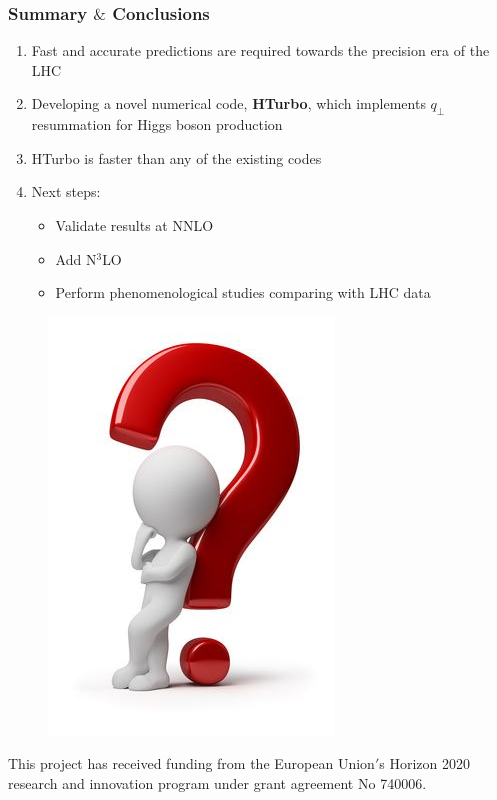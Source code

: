 \documentclass[aspectratio=43]{beamer}
\begin{document}
\begin{frame}
	
	\frametitle{Summary $\&$ Conclusions}

	\vspace{2.0 cm}
	
	\begin{enumerate}
		\item Fast and accurate predictions are required towards the precision era of the LHC
		\item Developing a novel numerical code, \textbf{HTurbo}, which implements $q_{\perp}$ resummation for Higgs boson production
		\item HTurbo is {\color{blue} faster than any of the existing codes}
		\item Next steps: 
		\begin{itemize}
			\item Validate results at NNLO
			\item Add {\color{blue}N$^{3}$LO}
			\item Perform phenomenological studies comparing with LHC data
		\end{itemize}

	\end{enumerate}

	\vspace{2.0 cm}

\end{frame}

\begin{frame}


	\begin{figure}
		\includegraphics[width = 4 cm]{plots/thinking.png}
	\end{figure}		

	{\small \color{blue} This project has received funding from the European Union$'$s Horizon 2020 research and innovation program under grant agreement No 740006.}

\end{frame}
\end{document}
